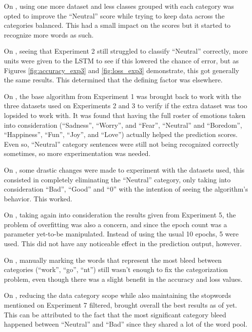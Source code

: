 On , using one more dataset and less classes grouped with each category was opted to improve the ``Neutral'' score while trying to keep data across the categories balanced. This had a small impact on the scores but it started to recognize more words as such.

On , seeing that Experiment 2 still struggled to classify ``Neutral'' correctly, more units were given to the LSTM to see if this lowered the chance of error, but as Figures \ref{fig:accuracy_exp3} and \ref{fig:loss_exp3} demonstrate, this got generally the same results. This determined that the defining factor was elsewhere.

On , the base algorithm from Experiment 1 was brought back to work with the three datasets used on Experiments 2 and 3 to verify if the extra dataset was too lopsided to work with. It was found that having the full roster of emotions taken into consideration (``Sadness'', ``Worry'', and ``Fear'', ``Neutral'' and ``Boredom'', ``Happiness'', ``Fun'', ``Joy'', and ``Love'') actually helped the prediction scores. Even so, ``Neutral'' category sentences were still not being recognized correctly sometimes, so more experimentation was needed.

On , some drastic changes were made to experiment with the datasets used, this consisted in completely eliminating the ``Neutral'' category, only taking into consideration ``Bad'', ``Good'' and ``0'' with the intention of seeing the algorithm's behavior. This worked. 

On , taking again into consideration the results given from Experiment 5, the problem of overfitting was also a concern, and since the epoch count was a parameter yet-to-be manipulated. Instead of using the usual 10 epochs, 5 were used. This did not have any noticeable effect in the prediction output, however.

On , manually marking the words that represent the most bleed between categories (``work'', ``go'', ``nt'') still wasn't enough to fix the categorization problem, even though there was a slight benefit in the accuracy and loss values.

On , reducing the data category scope while also maintaining the stopwords mentioned on Experiment 7 filtered, brought overall the best results as of yet. This can be attributed to the fact that the most significant category bleed happened between ``Neutral'' and ``Bad'' since they shared a lot of the word pool.

